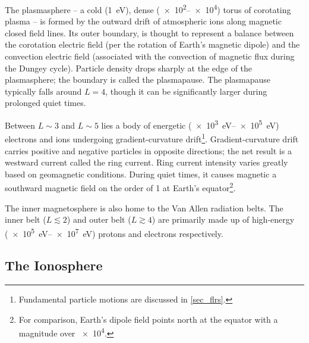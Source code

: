 The plasmasphere -- a cold (\about\SI{1}{\eV}), dense (\SIrange{e2}{e4}{\percc}) torus of corotating plasma -- is formed by the outward drift of atmospheric ions along magnetic closed field lines. Its outer boundary, is thought to represent a balance between the corotation electric field (per the rotation of Earth's magnetic dipole) and the convection electric field (associated with the convection of magnetic flux during the Dungey cycle). Particle density drops sharply at the edge of the plasmasphere; the boundary is called the plasmapause. The plasmapause typically falls around $L=4$, though it can be significantly larger during prolonged quiet times. 

Between $L\sim3$ and $L\sim5$ lies a body of energetic (\SIrange{e3}{e5}{\eV}) electrons and ions undergoing gradient-curvature drift\footnote{Fundamental particle motions are discussed in \cref{sec_flrs}. }. Gradient-curvature drift carries positive and negative particles in opposite directions; the net result is a westward current called the ring current. Ring current intensity varies greatly based on geomagnetic conditions. During quiet times, it causes magnetic a southward magnetic field on the order of \SI{1}{\nT} at Earth's equator\footnote{For comparison, Earth's dipole field points north at the equator with a magnitude over \SI{e4}{\nT}. }. 

The inner magnetosphere is also home to the Van Allen radiation belts. The inner belt ($L\lesssim2$) and outer belt ($L\gtrsim4$) are primarily made up of high-energy (\SIrange{e5}{e7}{\eV}) protons and electrons respectively. 


\subsection{The Ionosphere}
  \label{sec_ionos}



